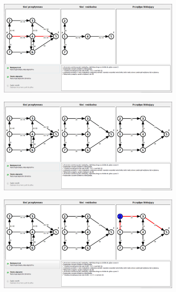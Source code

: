 \begin{appendices}
\begin{figure}
\begin{subfigure}{\textwidth}
 		\end{subfigure}\par\bigskip
 		\begin{subfigure}{\textwidth}
 			\includegraphics[width=0.9\linewidth]{./img/mkm04.jpg}
 		\end{subfigure}\par\bigskip
 		\begin{subfigure}{\textwidth}
 			\includegraphics[width=0.9\linewidth]{./img/mkm05.jpg}
 		\end{subfigure}
 	\end{figure}
 	\begin{figure}
 		\ContinuedFloat
 		\begin{subfigure}{\textwidth}
 			\includegraphics[width=0.9\linewidth]{./img/mkm06.jpg}

\end{subfigure}
\end{figure}
\end{appendices}
